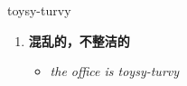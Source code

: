 
\begin{frame}
{\huge toysy-turvy}
\begin{center}
\begin{enumerate}\Large
  \item \textbf{混乱的，不整洁的}
  \begin{itemize}
    \item \em{\Large{the office is toysy-turvy}}
  \end{itemize}
\end{enumerate}
\end{center}
\end{frame}
